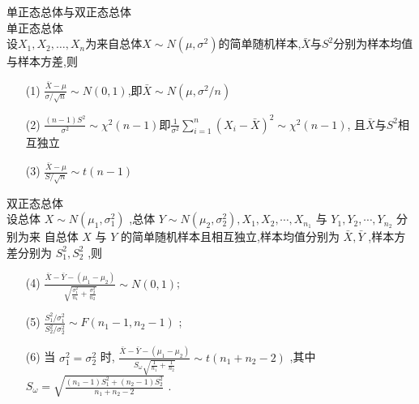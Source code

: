 \documentclass[12pt, a4paper, oneside, UTF8]{ctexbook}
\begin{document}
\begin{remark}
    单正态总体与双正态总体 \\
    单正态总体 \\
    设$X_1,X_2,\ldots,X_n$为来自总体$X\sim N(\mu,\sigma^2)$的简单随机样本,$\bar{X}$与$S^2$分别为样本均值与样本方差,则
    \begin{enumerate}
    \item [(1)] $\frac{\bar{X}-\mu}{\sigma/\sqrt{n}}\sim N(0,1)$,即$\bar{X}\sim N(\mu,\sigma^2/n)$
    \item [(2)] $\frac{(n-1)S^2}{\sigma^2}\sim\chi^2(n-1)$即$\frac{1}{\sigma^2}\sum_{i=1}^{n}(X_i-\bar{X})^2\sim\chi^2(n-1)$,
    且$\bar{X}$与$S^2$相互独立 
    \item[(3)] $\frac{\bar{X}-\mu}{S/\sqrt{n}}\sim t(n-1)$
    \end{enumerate}
    双正态总体 \\
    设总体 $X \sim  N\left( {{\mu }_{1},{\sigma }_{1}^{2}}\right)$ ,总体 $Y \sim  N\left( {{\mu }_{2},{\sigma }_{2}^{2}}\right) ,{X}_{1},{X}_{2},\cdots ,{X}_{{n}_{1}}$ 与 ${Y}_{1},{Y}_{2},\cdots ,{Y}_{{n}_{2}}$ 分别为来
    自总体 $X$ 与 $Y$ 的简单随机样本且相互独立,样本均值分别为 $\bar{X},\bar{Y}$ ,样本方差分别为 ${S}_{1}^{2},{S}_{2}^{2}$ ,则
    \begin{enumerate}
    \item[(4)] $\frac{\bar{X} - \bar{Y} - \left( {{\mu }_{1} - {\mu }_{2}}\right) }{\sqrt{\frac{{\sigma }_{1}^{2}}{{n}_{1}} + \frac{{\sigma }_{2}^{2}}{{n}_{2}}}} \sim  N\left( {0,1}\right)$;
    \item[(5)]$\frac{S_1^2/{\sigma }_{1}^{2}}{{S}_{2}^{2}/\sigma_2^2} \sim  F\left( {{n}_{1} - 1,{n}_{2} - 1}\right)$ ;
    \item[(6)]当 ${\sigma }_{1}^{2} = {\sigma }_{2}^{2}$ 时, $\frac{\bar{X} - \bar{Y} - \left( {{\mu }_{1} - {\mu }_{2}}\right) }{{S}_{\omega }\sqrt{\frac{1}{{n}_{1}} + \frac{1}{{n}_{2}}}} \sim  t\left( {{n}_{1} + {n}_{2} - 2}\right)$ ,其中 ${S}_{\omega } = \sqrt{\frac{\left( {{n}_{1} - 1}\right) {S}_{1}^{2} + \left( {{n}_{2} - 1}\right) {S}_{2}^{2}}{{n}_{1} + {n}_{2} - 2}}$ .
    \end{enumerate}
\end{remark}
\end{document}
